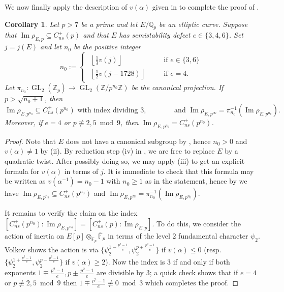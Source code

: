 \documentclass{amsart}
\newtheorem{corollary}[theorem]{Corollary}
\theoremstyle{definition}
\newcommand{\Z}{\mathbb{Z}}
\newcommand{\Q}{\mathbb{Q}}
\newcommand{\GL}{\operatorname{GL}}
\numberwithin{theorem}{section}
\numberwithin{equation}{section}
\begin{document}
We now finally apply the description of $v(\alpha)$ given in  to complete the proof of .


\begin{corollary}\label{cor: explicit p-adic image}
    Let $p>7$ be a prime and let $E/\Q_p$ be an elliptic curve. Suppose that $\operatorname{Im}\rho_{E,p} \subseteq C_{ns}^+(p)$ and that $E$ has semistability defect $e \in \{3,4,6\}$. Set $j=j(E)$ and let $n_0$ be the positive integer
    \[
    n_0 := \begin{cases}
    \begin{array}{lll}
    \!\left\lfloor \frac{1}{3}v(j) \right\rfloor & \quad & \text{if $e \in \{3,6\}$} \\
    \!\left\lfloor \frac{1}{2}v(j-1728) \right\rfloor & \quad & \text{if $e = 4$.}
    \end{array}
    \end{cases}
    \]
    Let $\pi_{n_0} : \GL_2(\Z_p) \to \GL_2(\Z/p^{n_0}\Z)$ be the canonical projection. If $p>\sqrt{n_0+1}$, then 
\[
\operatorname{Im}\rho_{E,p^{n_0}} \subseteq C_{ns}^+(p^{n_0}) \text{ with index dividing $3$,} \qquad\qquad \text{and} \,\, \operatorname{Im}\rho_{E,p^\infty} = \pi_{n_0}^{-1}(\operatorname{Im}\rho_{E,p^{n_0}}).
\]
Moreover, if $e=4$ or $p \not\equiv 2,5 \bmod 9$, then $\operatorname{Im}\rho_{E,p^{n_0}} = C_{ns}^+(p^{n_0})$. 
\end{corollary}

\begin{proof}
Note that $E$ does not have a canonical subgroup by , hence $n_0>0$ and $v(\alpha) \neq 1$ by (ii). By reduction step (iv) in , we are free to replace $E$ by a quadratic twist. After possibly doing so, we may apply (iii) to get an explicit formula for $v(\alpha)$ in terms of $j$. It is immediate to check that this formula may be written as $v(\alpha^{-1})=n_0-1$ with $n_0 \geq 1$ as in the statement, hence by  we have $\operatorname{Im}\rho_{E,p^{n_0}} \subseteq C_{ns}^+(p^{n_0})$ and $\operatorname{Im}\rho_{E,p^\infty} = \pi_{n_0}^{-1}(\operatorname{Im}\rho_{E,p^{n_0}})$.

It remains to verify the claim on the index $[C_{ns}^+(p^{n_0}):\operatorname{Im}\rho_{E,p^{n_0}}]=[C_{ns}^+(p) : \operatorname{Im} \rho_{E, p}]$. To do this, we consider the action of inertia on $E[p] \otimes_{\mathbb{F}_p} \overline{\mathbb{F}}_p$ in terms of the level $2$ fundamental character $\psi_2$. Volkov \cite[p.~129, p.~131]{Volkov} shows the action is via $\{\psi_2^{1-\frac{p^2-1}{e}},\psi_2^{p+\frac{p^2-1}{e}} \}$ if $v(\alpha)\leq 0$ (resp.~$\{\psi_2^{1+\frac{p^2-1}{e}},\psi_2^{p-\frac{p^2-1}{e}} \}$ if $v(\alpha)\geq 2$). Now the index is $3$ if and only if both exponents $1 \mp \frac{p^2-1}{e}, p \pm \frac{p^2-1}{e}$ are divisible by $3$; a quick check shows that if $e=4$ or $p \not \equiv 2,5 \bmod{9}$ then $1 \mp \frac{p^2-1}{e} \not\equiv 0 \bmod 3$ which completes the proof.
\end{proof}
\end{document}
